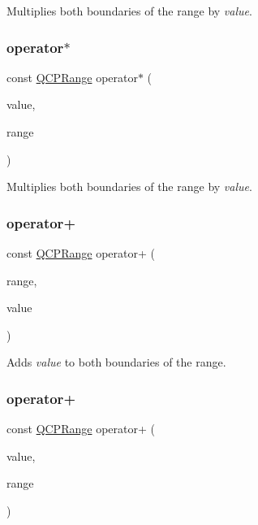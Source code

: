 Multiplies both boundaries of the range by {\itshape value}. \mbox{\label{class_q_c_p_range_a5cb2332f6957021f47cc768089f4f090}} 
\subsubsection{\texorpdfstring{operator$\ast$}{operator*}\hspace{0.1cm}{\footnotesize\ttfamily [2/2]}}
{\footnotesize\ttfamily const \hyperlink{class_q_c_p_range}{Q\+C\+P\+Range} operator$\ast$ (\begin{DoxyParamCaption}\item[{double}]{value,  }\item[{const \hyperlink{class_q_c_p_range}{Q\+C\+P\+Range} \&}]{range }\end{DoxyParamCaption})\hspace{0.3cm}{\ttfamily [friend]}}

Multiplies both boundaries of the range by {\itshape value}. \mbox{\label{class_q_c_p_range_af53ea6fb823a4a5897162b865841de04}} 
\subsubsection{\texorpdfstring{operator+}{operator+}\hspace{0.1cm}{\footnotesize\ttfamily [1/2]}}
{\footnotesize\ttfamily const \hyperlink{class_q_c_p_range}{Q\+C\+P\+Range} operator+ (\begin{DoxyParamCaption}\item[{const \hyperlink{class_q_c_p_range}{Q\+C\+P\+Range} \&}]{range,  }\item[{double}]{value }\end{DoxyParamCaption})\hspace{0.3cm}{\ttfamily [friend]}}

Adds {\itshape value} to both boundaries of the range. \mbox{\label{class_q_c_p_range_a9fb2e9941d32001482df670c0d704977}} 
\subsubsection{\texorpdfstring{operator+}{operator+}\hspace{0.1cm}{\footnotesize\ttfamily [2/2]}}
{\footnotesize\ttfamily const \hyperlink{class_q_c_p_range}{Q\+C\+P\+Range} operator+ (\begin{DoxyParamCaption}\item[{double}]{value,  }\item[{const \hyperlink{class_q_c_p_range}{Q\+C\+P\+Range} \&}]{range }\end{DoxyParamCaption})\hspace{0.3cm}{\ttfamily [friend]}}

